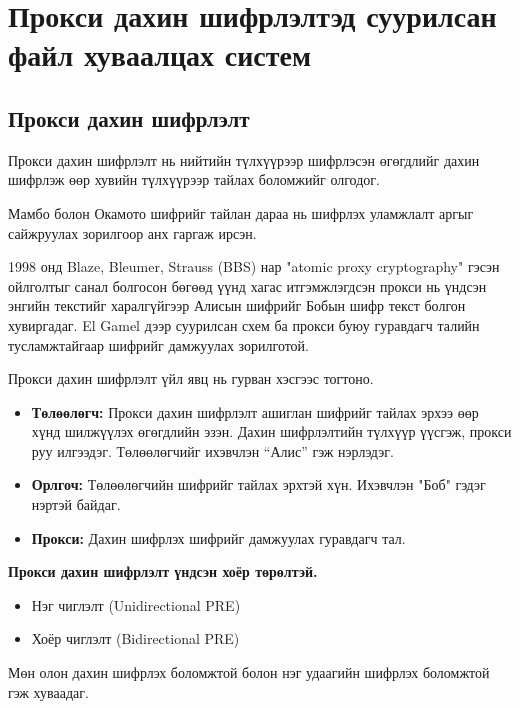 
\chapter{Прокси дахин шифрлэлтэд суурилсан файл хуваалцах систем} %
\label{Chapter2} %
\pagecolor{white}

\section{Прокси дахин шифрлэлт}
Прокси дахин шифрлэлт нь нийтийн түлхүүрээр шифрлэсэн өгөгдлийг дахин шифрлэж өөр хувийн түлхүүрээр тайлах боломжийг олгодог.

Мамбо болон Окамото шифрийг тайлан дараа нь шифрлэх уламжлалт аргыг сайжруулах зорилгоор анх гаргаж ирсэн.

1998 онд Blaze, Bleumer, Strauss (BBS) нар "atomic proxy cryptography" гэсэн ойлголтыг санал болгосон бөгөөд үүнд хагас итгэмжлэгдсэн прокси нь үндсэн энгийн текстийг харалгүйгээр Алисын шифрийг Бобын шифр текст болгон хувиргадаг. El Gamel дээр суурилсан схем ба прокси буюу гуравдагч талийн тусламжтайгаар шифрийг дамжуулах зорилготой. \cite{ateniese2005improved}

Прокси дахин шифрлэлт үйл явц нь гурван хэсгээс тогтоно.
\begin{itemize}
    \item \textbf{Төлөөлөгч:} Прокси дахин шифрлэлт ашиглан шифрийг тайлах эрхээ өөр хүнд шилжүүлэх өгөгдлийн эзэн. Дахин шифрлэлтийн түлхүүр үүсгэж, прокси руу илгээдэг. Төлөөлөгчийг ихэвчлэн “Алис” гэж нэрлэдэг.
    \item \textbf{Орлгоч:} Төлөөлөгчийн шифрийг тайлах эрхтэй хүн. Ихэвчлэн "Боб" гэдэг нэртэй байдаг.
    \item \textbf{Прокси:} Дахин шифрлэх шифрийг дамжуулах гуравдагч тал.
\end{itemize}

\textbf{Прокси дахин шифрлэлт үндсэн хоёр төрөлтэй.}
\begin{itemize}
    \item Нэг чиглэлт (Unidirectional PRE)
    \item Хоёр чиглэлт (Bidirectional PRE)
\end{itemize}
Мөн олон дахин шифрлэх боломжтой болон нэг удаагийн шифрлэх боломжтой гэж хуваадаг.

